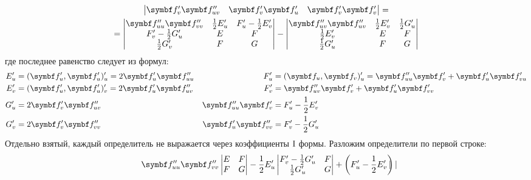 \documentclass[main]{subfiles}
\begin{document}
\begin{longProof}
\begin{multline*}
\begin{vmatrix}
            \vf'_v \vf''_{uv}     & \vf'_v\vf'_u      & \vf'_v \vf'_v
        \end{vmatrix}= \\
        = \begin{vmatrix}
            \vf''_{uu} \vf''_{vv}  & \frac{1}{2}E'_u & F'_u - \frac{1}{2}E'_v \\
            F'_v - \frac{1}{2}G'_u & E               & F                      \\
            \frac{1}{2}G'_v        & F               & G
        \end{vmatrix}-
        \begin{vmatrix}
            \vf''_{uv}\vf''_{uv} & \frac{1}{2} E'_v & \frac{1}{2} G'_u \\
            \frac{1}{2} E'_v     & E                & F                \\
            \frac{1}{2} G'_u     & F                & G
        \end{vmatrix}
    \end{multline*}
    где последнее равенство следует из формул:
    \begin{align*}
        E'_u & = (\vf'_u, \vf'_u)'_u = 2\vf'_u \vf''_{uu} & F'_u              & = (\vf_u, \vf_v)'_u = \vf''_{uu}\vf'_v + \vf'_u \vf'_{vu} \\
        E'_v & = (\vf'_u, \vf'_u)'_v = 2\vf'_u \vf''_{uv} & F'_v              & = \vf''_{uv}\vf'_v + \vf'_u \vf'_{vv}                     \\
        G'_u & = 2 \vf'_v \vf''_{uv}                      & \vf''_{uu}\vf'_v  & = F'_u - \frac{1}{2}E'_v                                  \\
        G'_v & = 2 \vf'_v \vf''_{vv}                      & \vf'_u \vf''_{vv} & = F'_v - \frac{1}{2}G'_u
    \end{align*}
    Отдельно взятый, каждый определитель не выражается через коэффициенты $\mathrm{I}$ формы.
    Разложим определители по первой строке:
    \begin{multline*}
        \vf''_{uu} \vf''_{vv} \begin{vmatrix}
            E & F \\
            F & G
        \end{vmatrix}
        - \frac{1}{2} E'_u \begin{vmatrix}
            F'_v - \frac{1}{2}G'_u & F \\
            \frac{1}{2}G'_u        & G
        \end{vmatrix}
        + \left(F'_u - \frac{1}{2} E'_v\right) \begin{vmatrix}

\end{vmatrix}
\end{multline*}
\end{longProof}
\end{document}
